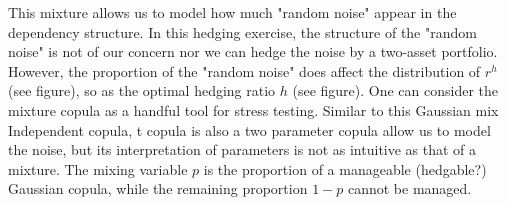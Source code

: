 \documentclass[square]{article} %
\begin{document}
    This mixture allows us to model how much "random noise" appear in the dependency structure.
    In this hedging exercise, the structure of the "random noise" is not of our concern nor we can
    hedge the noise by a two-asset portfolio.
    However, the proportion of the "random noise" does affect the distribution of $r^h$ (see figure),
    so as the optimal hedging ratio $h$ (see figure).
    One can consider the mixture copula as a handful tool for stress testing.
    Similar to this Gaussian mix Independent copula,
    t copula is also a two parameter copula allow us to model the noise,
    but its interpretation of parameters is not as intuitive as that of a mixture.
    The mixing variable $p$ is the proportion of a manageable (hedgable?) Gaussian copula,
    while the remaining proportion $1-p$ cannot be managed.
    
\end{document}
